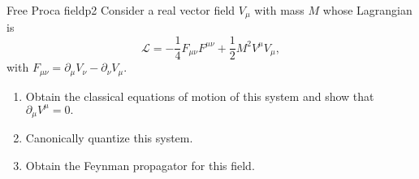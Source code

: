 \begin{problem}{Free Proca field}{p2}
   Consider a real vector field \(V_\mu\) with mass \(M\) whose Lagrangian is
   \begin{equation*}
      \mathcal{L} = - \frac14 F_{\mu \nu} F^{\mu\nu} + \frac12 M^2 V^\mu V_\mu,
   \end{equation*}
   with \(F_{\mu\nu} = \partial_\mu V_\nu - \partial_\nu V_\mu.\)
   \begin{enumerate}[label=(\alph*)]
       \item Obtain the classical equations of motion of this system and show that \(\partial_\mu V^\mu = 0.\)
       \item Canonically quantize this system.
   \item Obtain the Feynman propagator for this field.
   \end{enumerate}
\end{problem}
